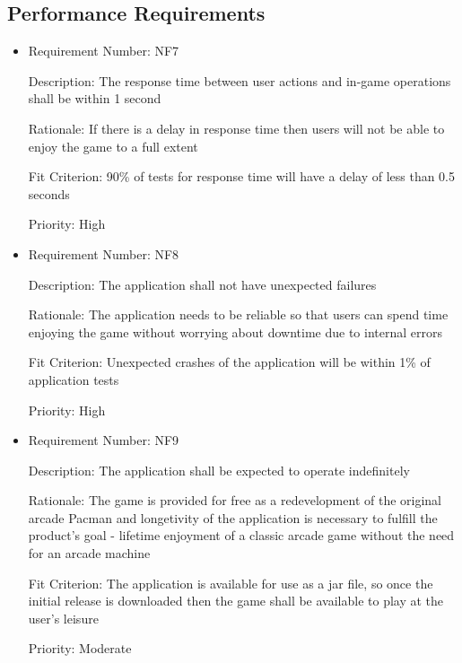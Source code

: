 \documentclass[12pt, titlepage]{article}
\begin{document}
\subsection{Performance Requirements}
\begin{itemize}
	\item
	Requirement Number: NF7

	Description: The response time between user actions and in-game operations shall be within 1 second

	Rationale: If there is a delay in response time then users will not be able to enjoy the game to a full extent

	Fit Criterion: 90\% of tests for response time will have a delay of less than 0.5 seconds

	Priority: High

	\item
	Requirement Number: NF8

	Description: The application shall not have unexpected failures

	Rationale: The application needs to be reliable so that users can spend time enjoying the game without worrying about downtime due to internal errors

	Fit Criterion: Unexpected crashes of the application will be within 1\% of application tests

	Priority: High

	\item
	Requirement Number: NF9

	Description: The application shall be expected to operate indefinitely

	Rationale: The game is provided for free as a redevelopment of the original arcade Pacman and longetivity of the application is necessary to fulfill the product's goal - lifetime enjoyment of a classic arcade game without the need for an arcade machine

	Fit Criterion: The application is available for use as a jar file, so once the initial release is downloaded then the game shall be available to play at the user's leisure

	Priority: Moderate

\end{itemize}
\end{document}
